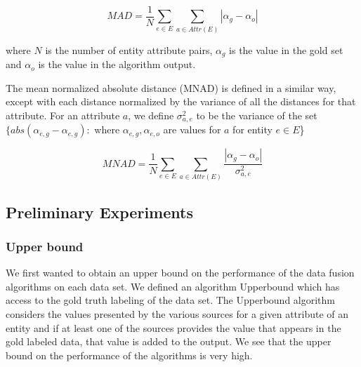 \documentclass{acm_proc_article-sp}
\begin{document}
\begin{equation}
MAD = \frac{1}{N} \sum_{e \in E} \sum_{a \in Attr(E)} | \alpha_g - \alpha_o |
\end{equation}

where $N$ is the number of entity attribute pairs, $\alpha_g$ is the value in the gold set and $\alpha_o$ is the value in the algorithm output. 

The mean normalized absolute distance (MNAD) is defined in a similar way, except with each distance normalized by the variance of all the distances for that attribute. For an attribute $a$, we define $\sigma^2_{a,e}$ to be the variance of the set $\{ abs(\alpha_{e,g}-\alpha_{e,g})   :  $ where $\alpha_{e,g}, \alpha_{e,o}$ are values for  $a$ for entity $e \in E$\} 

\begin{equation}
MNAD = \frac{1}{N} \sum_{e \in E} \sum_{a \in Attr(E)} \frac{| \alpha_g - \alpha_o |}{\sigma^2_{a,e}}
\end{equation}


\newcommand{\headcol}{\rowcolor{tableheadcolor}} %



\subsection{Preliminary Experiments}

\subsubsection{Upper bound}

We first wanted to obtain an upper bound on the performance of the data fusion algorithms on each data set. We defined an algorithm {\sc Upperbound} which has access to the gold truth labeling of the data set. The {\sc Upperbound} algorithm considers the values presented by the various sources for a given attribute of an entity and if at least one of the sources provides the value that appears in the gold labeled data, that value is added to the output. We see that the upper bound on the performance of the algorithms is very high. 
\end{document}

